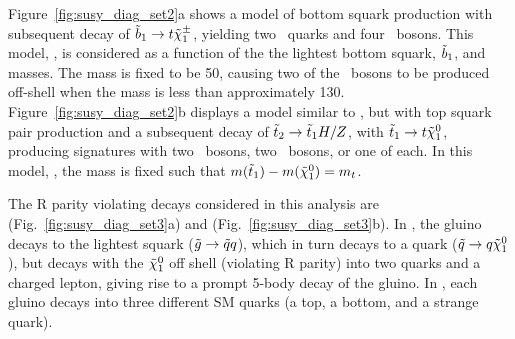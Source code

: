 Figure~\ref{fig:susy_diag_set2}a shows a model of bottom squark production with
subsequent decay of $\tilde{b}_1 \to t \tilde{\chi}_1^{\pm}$, yielding two \cPqb\
quarks and four \PW\ bosons. This model, \TsttWW, is considered as a function
of the the lightest bottom squark, $\tilde{b}_1$, and \chiplmin masses. The
\lsp mass is fixed to be 50\GeV, causing two of the \PW\ bosons to be
produced off-shell when the \chiplmin mass is less than approximately
130\GeV. Figure~\ref{fig:susy_diag_set2}b displays a model similar to \TsttWW, but
with top squark pair production and a subsequent decay of
$\tilde{t}_2\to\tilde{t}_1H/Z$, with $\tilde{t}_1 \to t\tilde{\chi}_1^0$,
producing signatures with two \PH\ bosons, two \PZ\ bosons, or one of each.
In this model, \TsttHZ, the \lsp mass is fixed such that
$m(\tilde{t}_1)-m(\tilde{\chi}_1^0)=m_{t}$.

The R parity violating decays considered in this analysis are \ToqqqqL
(Fig.~\ref{fig:susy_diag_set3}a) and \Totbs (Fig.~\ref{fig:susy_diag_set3}b). In
\ToqqqqL, the gluino decays to the lightest squark ($\tilde{g} \to \tilde{q}
q$), which in turn decays to a quark ($\tilde{q} \to q \tilde{\chi}_1^0$), but decays
with the $\tilde{\chi}_1^0$ off shell (violating R parity) into two quarks and a charged
lepton, giving rise to a prompt 5-body decay of the gluino. In \Totbs, each
gluino decays into three different SM quarks (a top, a bottom, and a strange
quark).


